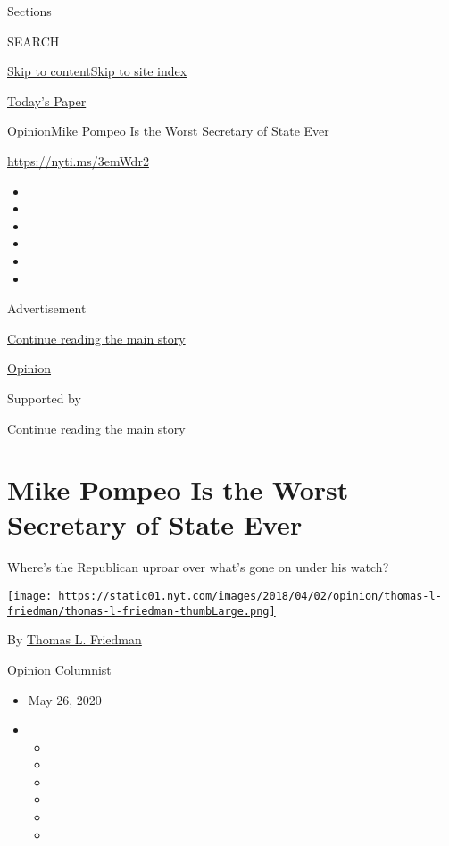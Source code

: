 Sections

SEARCH

\protect\hyperlink{site-content}{Skip to
content}\protect\hyperlink{site-index}{Skip to site index}

\href{https://myaccount.nytimes.com/auth/login?response_type=cookie\&client_id=vi}{}

\href{https://www.nytimes.com/section/todayspaper}{Today's Paper}

\href{/section/opinion}{Opinion}\textbar{}Mike Pompeo Is the Worst
Secretary of State Ever

\href{https://nyti.ms/3emWdr2}{https://nyti.ms/3emWdr2}

\begin{itemize}
\item
\item
\item
\item
\item
\item
\end{itemize}

Advertisement

\protect\hyperlink{after-top}{Continue reading the main story}

\href{/section/opinion}{Opinion}

Supported by

\protect\hyperlink{after-sponsor}{Continue reading the main story}

\hypertarget{mike-pompeo-is-the-worst-secretary-of-state-ever}{%
\section{Mike Pompeo Is the Worst Secretary of State
Ever}\label{mike-pompeo-is-the-worst-secretary-of-state-ever}}

Where's the Republican uproar over what's gone on under his watch?

\href{https://www.nytimes.com/by/thomas-l-friedman}{\texttt{[image: https://static01.nyt.com/images/2018/04/02/opinion/thomas-l-friedman/thomas-l-friedman-thumbLarge.png]}}

By \href{https://www.nytimes.com/by/thomas-l-friedman}{Thomas L.
Friedman}

Opinion Columnist

\begin{itemize}
\item
  May 26, 2020
\item
  \begin{itemize}
  \item
  \item
  \item
  \item
  \item
  \item
  \end{itemize}
\end{itemize}

